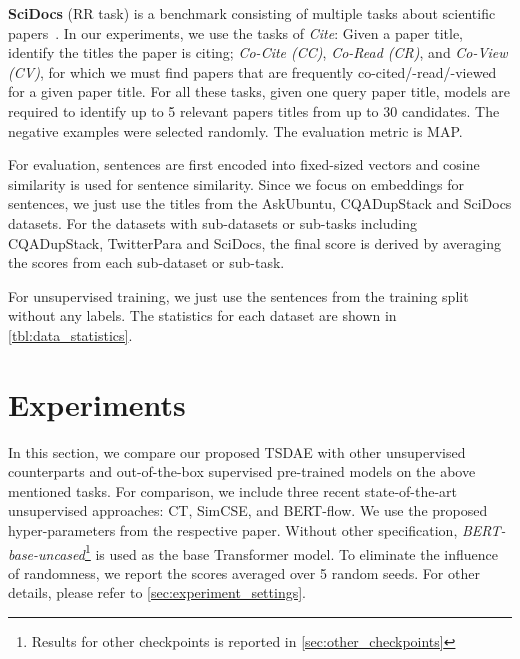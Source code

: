 \documentclass[11pt]{article}
\begin{document}
\textbf{SciDocs} (RR task) is a benchmark consisting of multiple tasks about scientific papers~\citep{DBLP:conf/acl/CohanFBDW20}. In our experiments, we use the tasks of \textit{Cite}: Given a paper title, identify the titles the paper is citing;  \textit{Co-Cite (CC)}, \textit{Co-Read (CR)}, and \textit{Co-View (CV)}, for which we must find papers that are frequently co-cited/-read/-viewed for a given paper title. For all these tasks, given one query paper title, models are required to identify up to 5 relevant papers titles from up to 30 candidates. The negative examples were selected randomly. The evaluation metric is MAP.

For evaluation, sentences are first encoded into fixed-sized vectors and cosine similarity is used for sentence similarity. Since we focus on embeddings for sentences, we just use the titles from the  AskUbuntu, CQADupStack and SciDocs datasets. For the datasets with sub-datasets or sub-tasks including CQADupStack, TwitterPara and SciDocs, the final score is derived by averaging the scores from each sub-dataset or sub-task.

For unsupervised training, we just use the sentences from the training split without any labels.  The statistics for each dataset are shown in \autoref{tbl:data_statistics}.







\section{Experiments}
\label{sec:exps}
In this section, we compare our proposed TSDAE with other unsupervised counterparts and  out-of-the-box supervised pre-trained models on the above mentioned tasks. For comparison, we include three recent state-of-the-art unsupervised approaches: CT, SimCSE, and BERT-flow. We use the proposed hyper-parameters from the respective paper. Without other specification, \textit{BERT-base-uncased}\footnote{Results for other checkpoints is reported in \autoref{sec:other_checkpoints}} is used as the base Transformer model. To eliminate the influence of randomness, we report the scores averaged over 5 random seeds. For other details, please refer to \autoref{sec:experiment_settings}.
\end{document}
